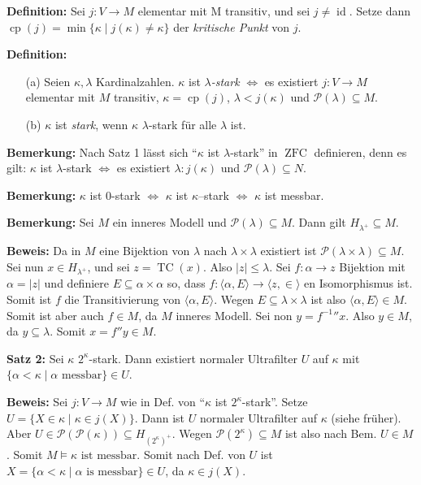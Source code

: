 \documentclass[a4paper,fontsize=11pt]{scrartcl}
\newcommand{\TC}{\operatorname{TC}}
\newcommand{\ZFC}{\operatorname{ZFC}}
\newcommand{\id}{\operatorname{id}}
\newcommand{\cp}{\operatorname{cp}}
\begin{document}
{\bf Definition:} Sei $j\colon V \to M$ elementar mit M transitiv, und sei $j\neq\id$.
	Setze dann $\cp(j)=\min\{\kappa\mid j(\kappa)\neq\kappa\}$ der {\em kritische Punkt} von $j$.

{\bf Definition:} \begin{itemize}\item[(a)] Seien $\kappa,\lambda$ Kardinalzahlen.
		$\kappa$ ist {\em $\lambda$-stark} $\iff$ es existiert $j\colon V\to M$ elementar mit $M$ transitiv, $\kappa=\cp(j)$, $\lambda<j(\kappa)$ und $\mathcal P(\lambda)\subseteq M$.
		\item[(b)] $\kappa$ ist {\em stark}, wenn $\kappa$ $\lambda$-stark für alle $\lambda$ ist.
	\end{itemize}

{\bf Bemerkung:} Nach Satz 1 lässt sich ``$\kappa$ ist $\lambda$-stark'' in $\ZFC$ definieren, denn es gilt:
	$\kappa$ ist $\lambda$-stark $\iff$ es existiert $\lambda\colon j(\kappa)$ und $\mathcal P(\lambda)\subseteq N$.

{\bf Bemerkung:} $\kappa$ ist $0$-stark $\iff$ $\kappa$ ist $\kappa$–stark $\iff$ $\kappa$ ist messbar.

{\bf Bemerkung:} Sei $M$ ein inneres Modell und $\mathcal P(\lambda)\subseteq M$.
	Dann gilt $H_{\lambda^+}\subseteq M$.
	
	{\bf Beweis:} Da in $M$ eine Bijektion von $\lambda$ nach $\lambda\times\lambda$ existiert ist $\mathcal P(\lambda\times\lambda)\subseteq M$.
		Sei nun $x\in H_{\lambda^+}$, und sei $z=\TC(x)$.
		Also $|z|\le\lambda$.
		Sei $f\colon\alpha\to z$ Bijektion mit $\alpha=|z|$ und definiere $E\subseteq \alpha\times\alpha$ so, dass $f\colon\langle\alpha, E\rangle\to\langle z,\in\rangle$ en Isomorphismus ist.
		Somit ist $f$ die Transitivierung von $\langle \alpha, E\rangle$.
		Wegen $E\subseteq\lambda\times\lambda$ ist also $\langle\alpha, E\rangle\in M$.
		Somit ist aber auch $f\in M$, da $M$ inneres Modell.
		Sei non $y={f^{-1}}''x$.
		Also $y\in M$, da $y\subseteq \lambda$.
		Somit $x=f''y\in M$.

{\bf Satz 2:} Sei $\kappa$ $2^\kappa$-stark.
	Dann existiert normaler Ultrafilter $U$ auf $\kappa$ mit $\{\alpha<\kappa\mid \alpha \mbox{ messbar}\}\in U$.

	{	\bf Beweis:} Sei $j\colon V\to M$ wie in Def. von ``$\kappa$ ist $2^\kappa$-stark''.	
	Setze $U=\{X\in \kappa\mid \kappa\in j(X)\}$.
	Dann ist $U$ normaler Ultrafilter auf $\kappa$ (siehe früher).
	Aber $U\in \mathcal P(\mathcal P(\kappa))\subseteq H_{(2^\kappa)^+}$.
	Wegen $\mathcal P(2^\kappa)\subseteq M$ ist also nach Bem. $U\in M$.
	Somit $M\models \kappa \mbox{ ist messbar}$.
	Somit nach Def. von $U$ ist $X=\{\alpha<\kappa\mid \alpha \mbox{ is messbar}\}\in U$, da $\kappa\in j(X)$.
\end{document}
